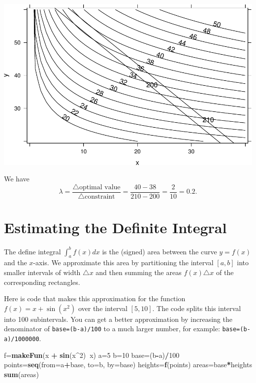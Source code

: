 \documentclass[
]{book}
\newenvironment{Shaded}{\begin{snugshade}}{\end{snugshade}}
\newcommand{\DataTypeTok}[1]{\textcolor[rgb]{0.13,0.29,0.53}{#1}}
\newcommand{\DecValTok}[1]{\textcolor[rgb]{0.00,0.00,0.81}{#1}}
\newcommand{\KeywordTok}[1]{\textcolor[rgb]{0.13,0.29,0.53}{\textbf{#1}}}
\newcommand{\NormalTok}[1]{#1}
\newcommand{\OperatorTok}[1]{\textcolor[rgb]{0.81,0.36,0.00}{\textbf{#1}}}
\newcommand{\StringTok}[1]{\textcolor[rgb]{0.31,0.60,0.02}{#1}}
\begin{document}
\includegraphics{_bookdown_files/math135_handbook_files/figure-latex/unnamed-chunk-55-2.pdf}

We have
\[
\lambda = \frac{\triangle \mbox{optimal value}}{\triangle \mbox{constraint}}
= \frac{40 - 38}{210-200} = \frac{2}{10} = 0.2.
\]

\hypertarget{estimating-the-definite-integral}{%
\section{Estimating the Definite Integral}\label{estimating-the-definite-integral}}

The define integral \(\int_{a}^b f(x) dx\) is the (signed) area between the curve \(y=f(x)\) and the \(x\)-axis. We approximate this area by partitioning the interval \([a,b]\) into smaller intervals of width \(\triangle x\) and then summing the areas \(f(x) \triangle x\) of the corresponding rectangles.

Here is code that makes this approximation for the function \(f(x) = x + \sin(x^2)\) over the interval \([5,10]\). The code splits this interval into 100 subintervals. You can get a better approximation by increasing the denominator of \texttt{base=(b-a)/100} to a much larger number, for example: \texttt{base=(b-a)/1000000}.

\begin{Shaded}
\begin{Highlighting}[]
\NormalTok{f=}\KeywordTok{makeFun}\NormalTok{(x }\OperatorTok{+}\StringTok{ }\KeywordTok{sin}\NormalTok{(x}\OperatorTok{^}\DecValTok{2}\NormalTok{)}\OperatorTok{~}\NormalTok{x)}
\NormalTok{a=}\DecValTok{5}
\NormalTok{b=}\DecValTok{10}
\NormalTok{base=(b}\OperatorTok{-}\NormalTok{a)}\OperatorTok{/}\DecValTok{100}
\NormalTok{points=}\KeywordTok{seq}\NormalTok{(}\DataTypeTok{from=}\NormalTok{a}\OperatorTok{+}\NormalTok{base, }\DataTypeTok{to=}\NormalTok{b, }\DataTypeTok{by=}\NormalTok{base)}
\NormalTok{heights=}\KeywordTok{f}\NormalTok{(points)}
\NormalTok{areas=base}\OperatorTok{*}\NormalTok{heights}
\KeywordTok{sum}\NormalTok{(areas)}
\end{Highlighting}
\end{Shaded}
\end{document}
